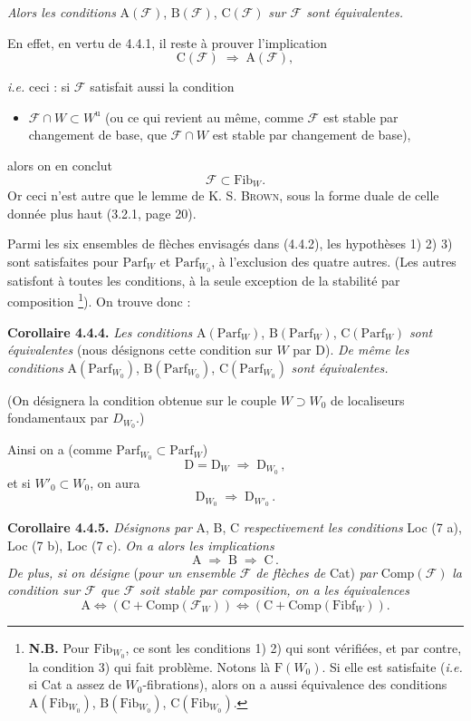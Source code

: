 \documentclass[11pt]{article}
\newcommand{\printedpage}[1]{\marginpar{\footnotesize p.~#1}}
\newcommand{\msp}[1]{\marginpar{\footnotesize [#1]}}
\newcommand{\Fib}{\mathrm{Fib}}
\newcommand{\Fibf}{\mathrm{Fibf}}
\newcommand{\Parf}{\mathrm{Parf}}
\newcommand{\cF}{\mathcal{F}}
\newcommand{\Comp}{\mathrm{Comp}}
\begin{document}
\printedpage{26}
\noindent\textit{Alors les conditions} $\mathrm{A}(\cF)$, $\mathrm{B}(\cF)$, $\mathrm{C}(\cF)$ \textit{sur $\cF$ sont équivalentes.}

En effet, en vertu de 4.4.1, il reste à prouver l'implication
\[
\mathrm{C}(\cF) \;\Longrightarrow\; \mathrm{A}(\cF),
\]

\msp{page 44}

\textit{i.e.} ceci : si $\cF$ satisfait aussi la condition
\begin{itemize}[leftmargin=3em]
\item[4)] $\cF \cap W \subset W^{\mathrm{u}}$ (ou ce qui revient au même, comme $\cF$ est stable par changement de base, que $\cF \cap W$ est stable par changement de base),
\end{itemize}
alors on en conclut
\[
\cF \subset \Fib_W.
\]
Or ceci n'est autre que le lemme de K. S. \textsc{Brown}, sous la forme duale de celle donnée plus haut (3.2.1, page 20).

Parmi les six ensembles de flèches envisagés dans (4.4.2), les hypothèses 1) 2) 3) sont satisfaites pour $\Parf_W$ et $\Parf_{W_0}$, à l'exclusion des quatre autres. (Les autres satisfont à toutes les conditions, à la seule exception de la stabilité par composition \footnote[30]{\textbf{N.B.} Pour $\Fib_{W_0}$, ce sont les conditions 1) 2) qui sont vérifiées, et par contre, la condition 3) qui fait problème. Notons là $\mathrm{F}(W_0)$. Si elle est satisfaite (\textit{i.e.} si Cat a assez de $W_0$-fibrations), alors on a aussi équivalence des conditions $\mathrm{A}(\Fib_{W_0})$, $\mathrm{B}(\Fib_{W_0})$, $\mathrm{C}(\Fib_{W_0})$.}). On trouve donc :

\textbf{Corollaire 4.4.4.} \textit{Les conditions} $\mathrm{A}(\Parf_W)$, $\mathrm{B}(\Parf_W)$, $\mathrm{C}(\Parf_W)$ \textit{sont équivalentes} (nous désignons cette condition sur $W$ par D). \textit{De même les conditions} $\mathrm{A}(\Parf_{W_0})$, $\mathrm{B}(\Parf_{W_0})$, $\mathrm{C}(\Parf_{W_0})$ \textit{sont équivalentes.}

\msp{page 45}

(On désignera la condition obtenue sur le couple $W \supset W_0$ de localiseurs fondamentaux par $D_{W_0}$.)

Ainsi on a (comme $\Parf_{W_0} \subset \Parf_W$)
\[
\mathrm{D} = \mathrm{D}_W \;\Longrightarrow\; \mathrm{D}_{W_0}\,,
\tag*{(4.4.4)}
\]
et si $W'_0 \subset W_0$, on aura
\[
\mathrm{D}_{W_0} \;\Longrightarrow\; \mathrm{D}_{W'_0}\,.
\tag*{(4.4.5)}
\]

\textbf{Corollaire 4.4.5.} \textit{Désignons par} A, B, C \textit{respectivement les conditions} Loc (7 a), Loc (7 b), Loc (7 c). \textit{On a alors les implications}
\[
\mathrm{A} \;\Longrightarrow\; \mathrm{B} \;\Longrightarrow\; \mathrm{C}\,.
\tag*{(4.4.5.1)}
\]
\textit{De plus, si on désigne} (\textit{pour un ensemble $\cF$ de flèches de} Cat) \textit{par} $\Comp(\cF)$ \textit{la condition sur $\cF$ que $\cF$ soit stable par composition, on a les équivalences}
\[
\mathrm{A} \iff (\mathrm{C} + \Comp(\cF_W)) \iff (\mathrm{C} + \Comp(\Fibf_W)).
\tag*{(4.4.5.2)}
\]
\end{document}
